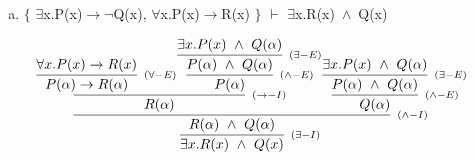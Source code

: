 \documentclass[aspectratio=43]{beamer}
\newcommand{\ria}{$\rightarrow$}
\newcommand{\fall}{$\forall$}
\newcommand{\ex}{$\exists$}
\newcommand{\nao}{$\neg$}
\newcommand{\andd}{$\wedge$}
\begin{document}
    \begin{frame}[fragile]
    
    	\begin{enumerate}[d)]
			\item $\{$ \ex x.P(x)\ria \nao Q(x), \fall x.P(x)\ria R(x) $\}$ $\vdash$ \ex x.R(x)\ \andd\ Q(x) \\
		\end{enumerate}
        
        \vspace{50pt}
        
        \[
        \begin{array}{c}
		
        	\infer[_{(\exists -I)}]
            	{\exists  x. R(x)\ \land\ Q(x)}
            	{\infer[_{(\land -I)}] 
                	{R(\alpha)\ \land\ Q(\alpha)}
                	{\infer[_{(\to -I)}]
            			{R(\alpha)}
            			{\infer[_{(\forall -E)}]
                			{P(\alpha) \rightarrow R(\alpha)} 
                    		{\forall x.P(x)\to R(x)} 
                		\infer[_{(\land -E)}] 
                			{P(\alpha)}
                    		{\infer[_{(\exists -E)}]
                    			{P(\alpha)\ \land \ Q(\alpha)}
                    			{\exists x.P(x)\ \land \ Q(\alpha)}
                    		}
                		}
                     \infer[_{(\land -E)}] 
                		{Q(\alpha)}
                    	{\infer[_{(\exists -E)}]
                    		{P(\alpha)\ \land \ Q(\alpha)}
                    		{\exists x.P(x)\ \land \ Q(\alpha)}
                    	}
                    }
                }
        
		\end{array}
        \]
        
	\end{frame}
    
\end{document}
